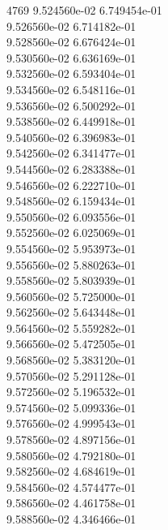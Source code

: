 4769	9.524560e-02	6.749454e-01	\\ 	9.526560e-02	6.714182e-01	\\ 	9.528560e-02	6.676424e-01	\\ 	9.530560e-02	6.636169e-01	\\ 	9.532560e-02	6.593404e-01	\\ 	9.534560e-02	6.548116e-01	\\ 	9.536560e-02	6.500292e-01	\\ 	9.538560e-02	6.449918e-01	\\ 	9.540560e-02	6.396983e-01	\\ 	9.542560e-02	6.341477e-01	\\ 	9.544560e-02	6.283388e-01	\\ 	9.546560e-02	6.222710e-01	\\ 	9.548560e-02	6.159434e-01	\\ 	9.550560e-02	6.093556e-01	\\ 	9.552560e-02	6.025069e-01	\\ 	9.554560e-02	5.953973e-01	\\ 	9.556560e-02	5.880263e-01	\\ 	9.558560e-02	5.803939e-01	\\ 	9.560560e-02	5.725000e-01	\\ 	9.562560e-02	5.643448e-01	\\ 	9.564560e-02	5.559282e-01	\\ 	9.566560e-02	5.472505e-01	\\ 	9.568560e-02	5.383120e-01	\\ 	9.570560e-02	5.291128e-01	\\ 	9.572560e-02	5.196532e-01	\\ 	9.574560e-02	5.099336e-01	\\ 	9.576560e-02	4.999543e-01	\\ 	9.578560e-02	4.897156e-01	\\ 	9.580560e-02	4.792180e-01	\\ 	9.582560e-02	4.684619e-01	\\ 	9.584560e-02	4.574477e-01	\\ 	9.586560e-02	4.461758e-01	\\ 	9.588560e-02	4.346466e-01	\\ \hline
